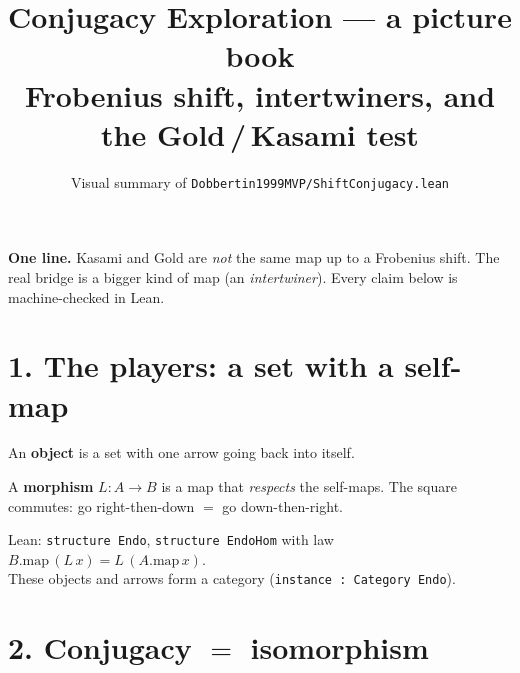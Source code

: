 \documentclass[11pt]{article}
\title{\vspace{-1.5cm}\textbf{Conjugacy Exploration --- a picture book}\\[2pt]
\large Frobenius shift, intertwiners, and the Gold\,/\,Kasami test}
\author{\small Visual summary of \texttt{Dobbertin1999MVP/ShiftConjugacy.lean}}
\date{}
\begin{document}
\maketitle
\vspace{-1.2cm}

\begin{note}
\textbf{One line.} Kasami and Gold are \emph{not} the same map up to a
Frobenius shift. The real bridge is a bigger kind of map (an
\emph{intertwiner}). Every claim below is machine-checked in Lean.
\end{note}

\section*{1. The players: a set with a self-map}

An \textbf{object} is a set with one arrow going back into itself.

\begin{center}
\end{center}

A \textbf{morphism} $L:A\to B$ is a map that \emph{respects} the self-maps.
The square commutes: go right-then-down $=$ go down-then-right.

\begin{center}
\end{center}

\begin{center}\small
Lean: \texttt{structure Endo}, \texttt{structure EndoHom} with law
$B.\mathrm{map}\,(L\,x)=L\,(A.\mathrm{map}\,x)$.\\
These objects and arrows form a category (\texttt{instance : Category Endo}).
\end{center}

\section*{2. Conjugacy $=$ isomorphism}
\end{document}

